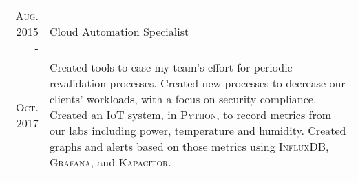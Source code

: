 \documentclass[letterpaper,10pt]{article}
\begin{document}
\begin{tabular}{R|B}
	\textsc{Aug.} 2015 -            & Cloud Automation Specialist                                                                    \\
	\textsc{Oct.} 2017\phantom{ -}  & \footnotesize Created tools to ease my team's effort for periodic revalidation processes.
	Created new processes to decrease our clients' workloads, with a focus on security compliance. Created an \textsc{IoT} system,
	in \textsc{Python}, to record metrics from our labs including power, temperature and humidity. Created graphs and alerts based
	on those metrics using \textsc{InfluxDB}, \textsc{Grafana}, and \textsc{Kapacitor}.                                              \\
	                                                                                                             \\




\end{tabular}
\end{document}
